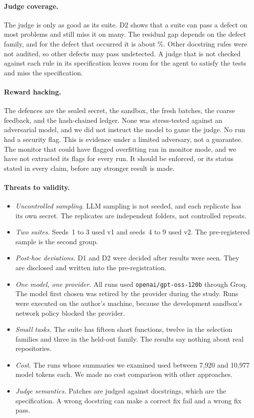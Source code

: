 \documentclass[11pt]{article}
\begin{document}
\paragraph{Judge coverage.} The judge is only as good as its suite. D2 shows that a suite can pass a defect on most problems and still miss it on many. The residual gap depends on the defect family, and for the defect that occurred it is about \ThrMissLoopVtwo\%. Other docstring rules were not audited, so other defects may pass undetected. A judge that is not checked against each rule in its specification leaves room for the agent to satisfy the tests and miss the specification.

\paragraph{Reward hacking.} The defences are the sealed secret, the sandbox, the fresh batches, the coarse feedback, and the hash-chained ledger. None was stress-tested against an adversarial model, and we did not instruct the model to game the judge. No run had a security flag. This is evidence under a limited adversary, not a guarantee. The monitor that could have flagged overfitting ran in monitor mode, and we have not extracted its flags for every run. It should be enforced, or its status stated in every claim, before any stronger result is made.

\paragraph{Threats to validity.}
\begin{itemize}\setlength\itemsep{1pt}
\item \emph{Uncontrolled sampling.} LLM sampling is not seeded, and each replicate has its own secret. The replicates are independent folders, not controlled repeats.
\item \emph{Two suites.} Seeds~1 to 3 used v1 and seeds~4 to 9 used v2. The pre-registered sample is the second group.
\item \emph{Post-hoc deviations.} D1 and D2 were decided after results were seen. They are disclosed and written into the pre-registration.
\item \emph{One model, one provider.} All runs used \texttt{openai/gpt-oss-120b} through Groq. The model first chosen was retired by the provider during the study. Runs were executed on the author's machine, because the development sandbox's network policy blocked the provider.
\item \emph{Small tasks.} The suite has fifteen short functions, twelve in the selection families and three in the held-out family. The results say nothing about real repositories.
\item \emph{Cost.} The runs whose summaries we examined used between 7{,}920 and 10{,}977 model tokens each. We made no cost comparison with other approaches.
\item \emph{Judge semantics.} Patches are judged against docstrings, which are the specification. A wrong docstring can make a correct fix fail and a wrong fix pass.
\end{itemize}
\end{document}
